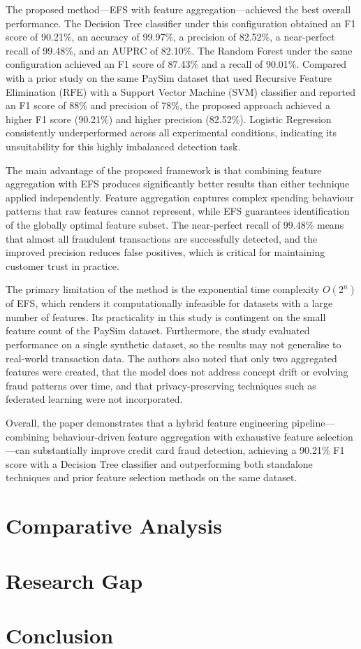 \documentclass[12pt, a4paper]{report}
\begin{document}
The proposed method---EFS with feature aggregation---achieved the best overall performance. The Decision Tree classifier under this configuration obtained an F1 score of 90.21\%, an accuracy of 99.97\%, a precision of 82.52\%, a near-perfect recall of 99.48\%, and an AUPRC of 82.10\%. The Random Forest under the same configuration achieved an F1 score of 87.43\% and a recall of 90.01\%. Compared with a prior study on the same PaySim dataset that used Recursive Feature Elimination (RFE) with a Support Vector Machine (SVM) classifier and reported an F1 score of 88\% and precision of 78\%, the proposed approach achieved a higher F1 score (90.21\%) and higher precision (82.52\%). Logistic Regression consistently underperformed across all experimental conditions, indicating its unsuitability for this highly imbalanced detection task.

The main advantage of the proposed framework is that combining feature aggregation with EFS produces significantly better results than either technique applied independently. Feature aggregation captures complex spending behaviour patterns that raw features cannot represent, while EFS guarantees identification of the globally optimal feature subset. The near-perfect recall of 99.48\% means that almost all fraudulent transactions are successfully detected, and the improved precision reduces false positives, which is critical for maintaining customer trust in practice.

The primary limitation of the method is the exponential time complexity $O(2^n)$ of EFS, which renders it computationally infeasible for datasets with a large number of features. Its practicality in this study is contingent on the small feature count of the PaySim dataset. Furthermore, the study evaluated performance on a single synthetic dataset, so the results may not generalise to real-world transaction data. The authors also noted that only two aggregated features were created, that the model does not address concept drift or evolving fraud patterns over time, and that privacy-preserving techniques such as federated learning were not incorporated.

Overall, the paper demonstrates that a hybrid feature engineering pipeline---combining behaviour-driven feature aggregation with exhaustive feature selection---can substantially improve credit card fraud detection, achieving a 90.21\% F1 score with a Decision Tree classifier and outperforming both standalone techniques and prior feature selection methods on the same dataset.



\chapter{Comparative Analysis}



\chapter{Research Gap}



\chapter{Conclusion}




\end{document}
